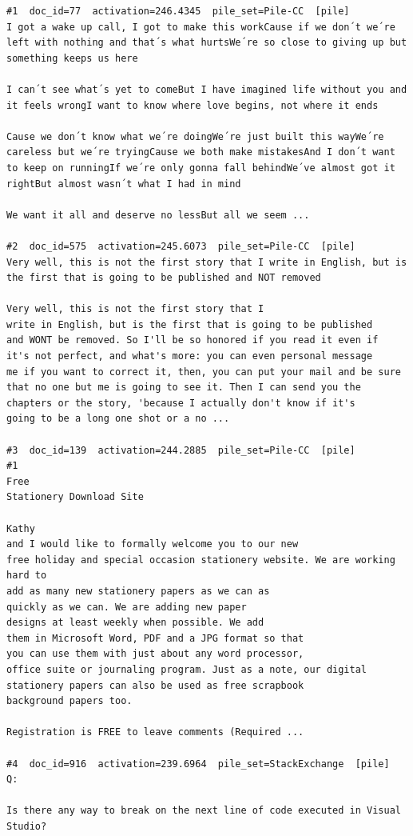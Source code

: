 \begin{verbatim}
#1  doc_id=77  activation=246.4345  pile_set=Pile-CC  [pile]
I got a wake up call, I got to make this workCause if we don´t we´re left with nothing and that´s what hurtsWe´re so close to giving up but something keeps us here

I can´t see what´s yet to comeBut I have imagined life without you and it feels wrongI want to know where love begins, not where it ends

Cause we don´t know what we´re doingWe´re just built this wayWe´re careless but we´re tryingCause we both make mistakesAnd I don´t want to keep on runningIf we´re only gonna fall behindWe´ve almost got it rightBut almost wasn´t what I had in mind

We want it all and deserve no lessBut all we seem ...

#2  doc_id=575  activation=245.6073  pile_set=Pile-CC  [pile]
Very well, this is not the first story that I write in English, but is the first that is going to be published and NOT removed

Very well, this is not the first story that I
write in English, but is the first that is going to be published
and WONT be removed. So I'll be so honored if you read it even if
it's not perfect, and what's more: you can even personal message
me if you want to correct it, then, you can put your mail and be sure
that no one but me is going to see it. Then I can send you the
chapters or the story, 'because I actually don't know if it's
going to be a long one shot or a no ...

#3  doc_id=139  activation=244.2885  pile_set=Pile-CC  [pile]
#1
Free
Stationery Download Site

Kathy
and I would like to formally welcome you to our new
free holiday and special occasion stationery website. We are working hard to
add as many new stationery papers as we can as
quickly as we can. We are adding new paper
designs at least weekly when possible. We add
them in Microsoft Word, PDF and a JPG format so that
you can use them with just about any word processor,
office suite or journaling program. Just as a note, our digital
stationery papers can also be used as free scrapbook
background papers too.

Registration is FREE to leave comments (Required ...

#4  doc_id=916  activation=239.6964  pile_set=StackExchange  [pile]
Q:

Is there any way to break on the next line of code executed in Visual Studio?


\end{verbatim}
